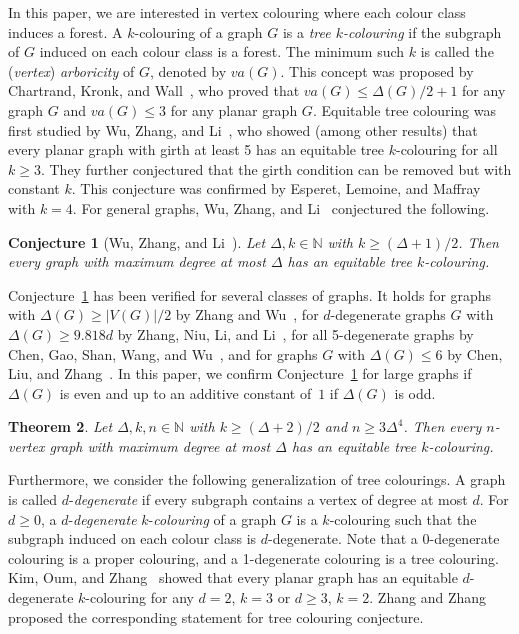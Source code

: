 \documentclass[11pt]{article}
\theoremstyle{plain}
\newtheorem{thm}{Theorem}[section]
\newtheorem{conj}[thm]{Conjecture}
\numberwithin{equation}{section}
\begin{document}
In this paper, we are interested in vertex colouring where each colour class induces a forest. A $k$-colouring of a graph $G$ is a \emph{tree $k$-colouring} if the subgraph of $G$ induced on each colour class is a forest. The minimum such $k$ is called the (\emph{vertex}) \emph{arboricity} of $G$, denoted by $va(G)$. This concept was proposed by Chartrand, Kronk, and Wall~\cite{CKW1968}, who proved that  $va(G)\leq \Delta(G)/2+1$ for any graph $G$ and $va(G)\leq 3$ for any planar graph $G$.
Equitable tree colouring was first studied by Wu, Zhang, and Li~\cite{WZL2013}, who showed (among other results) that every planar graph with girth at least 5 has an equitable tree $k$-colouring for all $k\geq 3$. They further conjectured that the girth condition can be removed but with constant $k$. This conjecture was confirmed by Esperet,  Lemoine, and Maffray~\cite{ELM2015} with $k=4$. For general graphs, Wu, Zhang, and Li~\cite{WZL2013} conjectured the following.

	\begin{conj}[Wu, Zhang, and Li~\cite{WZL2013}]\label{EVAC}
Let $\Delta, k\in \mathbb{N}$ with $k \ge (\Delta+1)/{2}$.
Then every graph with maximum degree at most $\Delta$ has an equitable tree $k$-colouring.
	\end{conj}
	

	Conjecture~\ref{EVAC} has been verified for several classes of graphs. It holds for graphs with $\Delta(G) \ge |V(G)|/{2}$ by Zhang and Wu~\cite{ZW2014}, for $d$-degenerate graphs $G$ with $\Delta(G) \ge 9.818d$ by Zhang, Niu, Li, and Li~\cite{ZNLL2021}, for all 5-degenerate graphs by Chen, Gao, Shan, Wang, and Wu~\cite{CGSWW2016}, and for graphs $G$ with $\Delta(G)\leq6$ by Chen, Liu, and Zhang~\cite{CLZ2025}.
In this paper, we confirm Conjecture~\ref{EVAC} for large graphs if $\Delta(G)$ is even and up to an additive constant of~$1$ if $\Delta(G)$ is odd.


\begin{thm} \label{thm:treecolouring}
Let $\Delta, k,n \in \mathbb{N}$ with $k \ge (\Delta+2)/{2}$ and $n  \ge3 \Delta^4$.
Then every $n$-vertex graph with maximum degree at most $\Delta$ has an equitable tree $k$-colouring.
\end{thm}

Furthermore, we consider the following generalization of tree colourings. A graph is called $d$-\emph{degenerate} if every subgraph contains a vertex of degree at most $d$. For $d\ge 0$, a $d$-\emph{degenerate} $k$-\emph{colouring} of a graph $G$ is a $k$-colouring such that the subgraph induced on  each colour class is $d$-degenerate.  Note that a $0$-degenerate colouring is a proper colouring, and a 1-degenerate colouring is a tree colouring. Kim, Oum, and Zhang~\cite{KOZ2021} showed that every planar graph has an equitable $d$-degenerate $k$-colouring for any $d=2$, $k=3$ or $d\geq3$, $k=2$. Zhang and Zhang~\cite{ZZ2021} proposed the corresponding statement for tree colouring conjecture.
\end{document}
